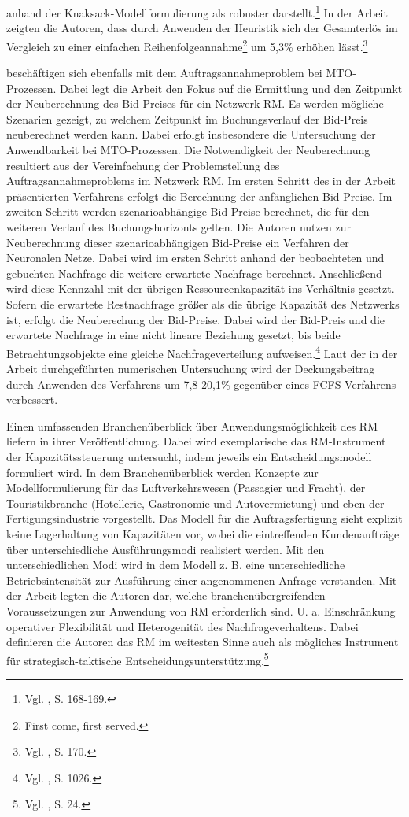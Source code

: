 anhand der Knaksack-Modell\-for\-mu\-lier\-ung als robuster darstellt.\footnote{Vgl. \cite{Spengler:2007aa}, S. 168-169.} In der Arbeit zeigten die Autoren, dass durch Anwenden der Heuristik sich der Gesamterlös im Vergleich zu einer einfachen Reihenfolgeannahme\footnote{\glqq First come, first served.\grqq} um 5,3\% erhöhen lässt.\footnote{Vgl. \cite{Spengler:2007aa}, S. 170.}

\cite{Volling20121021} beschäftigen sich ebenfalls mit dem Auftragsannahmeproblem bei MTO-Prozessen. Dabei legt die Arbeit den Fokus auf die Ermittlung und den Zeitpunkt der Neuberechnung des Bid-Preises für ein Netzwerk RM. Es werden mögliche Szenarien gezeigt, zu welchem Zeitpunkt im Buchungsverlauf der Bid-Preis neuberechnet werden kann. Dabei erfolgt insbesondere die Untersuchung der Anwendbarkeit bei MTO-Prozessen. Die Notwendigkeit der Neuberechnung resultiert aus der Vereinfachung der Problemstellung des Auftragsannahmeproblems im Netzwerk RM. Im ersten Schritt des in der Arbeit präsentierten Verfahrens erfolgt die Berechnung der anfänglichen Bid-Preise. Im zweiten Schritt werden szenarioabhängige Bid-Preise berechnet, die für den weiteren Verlauf des Buchungshorizonts gelten. Die Autoren nutzen zur Neuberechnung dieser szenarioabhängigen Bid-Preise ein Verfahren der \glqq Neuronalen Netze{\grqq}. Dabei wird im ersten Schritt anhand der beobachteten und gebuchten Nachfrage die weitere erwartete Nachfrage berechnet. Anschließend wird diese Kennzahl mit der übrigen Ressourcenkapazität ins Verhältnis gesetzt. Sofern die erwartete Restnachfrage größer als die übrige Kapazität des Netzwerks ist, erfolgt die Neuberechung der Bid-Preise. Dabei wird der Bid-Preis und die erwartete Nachfrage in eine nicht lineare Beziehung gesetzt, bis beide Betrachtungsobjekte eine gleiche Nachfrageverteilung aufweisen.\footnote{Vgl. \cite{Volling20121021}, S. 1026.} Laut der in der Arbeit durchgeführten numerischen Untersuchung wird der Deckungsbeitrag durch Anwenden des Verfahrens um 7,8-20,1\% gegenüber eines FCFS-Verfahrens verbessert.

Einen umfassenden Branchenüberblick über Anwendungsmöglichkeit des RM liefern \cite{kimms2005branchenverg} in ihrer Veröffentlichung. Dabei wird exemplarische das RM-Instrument der Kapazitätssteuerung untersucht, indem jeweils ein Entscheidungsmodell formuliert wird. In dem Branchenüberblick werden Konzepte zur Modellformulierung für das Luftverkehrswesen (Passagier und Fracht), der Touristikbranche (Hotellerie, Gastronomie und Autovermietung) und eben der Fertigungsindustrie vorgestellt. Das Modell für die Auftragsfertigung sieht explizit keine Lagerhaltung von Kapazitäten vor, wobei die eintreffenden Kundenaufträge über unterschiedliche Ausführungsmodi realisiert werden. Mit den unterschiedlichen Modi wird in dem Modell z. B. eine unterschiedliche Betriebsintensität zur Ausführung einer angenommenen Anfrage verstanden. Mit der Arbeit legten die Autoren dar, welche branchenübergreifenden Voraussetzungen zur Anwendung von RM erforderlich sind. U. a. Einschränkung operativer Flexibilität und Heterogenität des Nachfrageverhaltens. Dabei definieren die Autoren das RM im weitesten Sinne auch als mögliches Instrument für strategisch-taktische Entscheidungsunterstützung.\footnote{Vgl. \cite{kimms2005branchenverg}, S. 24.} 

